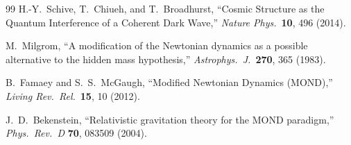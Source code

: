 \documentclass[11pt,a4paper]{article}
\begin{document}
\begin{thebibliography}{99}
H.-Y.~Schive, T.~Chiueh, and T.~Broadhurst,
``Cosmic Structure as the Quantum Interference of a Coherent Dark Wave,''
\textit{Nature Phys.}\ \textbf{10}, 496 (2014).

M.~Milgrom,
``A modification of the Newtonian dynamics as a possible alternative
to the hidden mass hypothesis,''
\textit{Astrophys.\ J.}\ \textbf{270}, 365 (1983).

B.~Famaey and S.~S.~McGaugh,
``Modified Newtonian Dynamics (MOND),''
\textit{Living Rev.\ Rel.}\ \textbf{15}, 10 (2012).

J.~D.~Bekenstein,
``Relativistic gravitation theory for the MOND paradigm,''
\textit{Phys.\ Rev.\ D} \textbf{70}, 083509 (2004).

\end{thebibliography}
\end{document}
